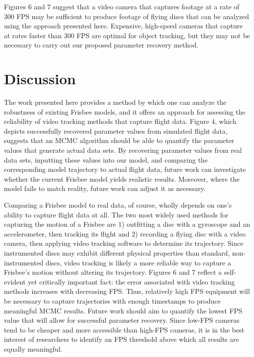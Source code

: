 \documentclass[a4paper,12pt, oneside]{article}
\begin{document}
Figures 6 and 7 suggest that a video camera that captures footage at a rate of 300 FPS may be sufficient to produce footage of flying discs that can be analyzed using the approach presented here. Expensive, high-speed cameras that capture at rates faster than 300 FPS are optimal for object tracking, but they may not be necessary to carry out our proposed parameter recovery method.

\section{Discussion}
The work presented here provides a method by which one can analyze the robustness of existing Frisbee models, and it offers an approach for assessing the reliability of video tracking methods that capture flight data.  Figure 4, which depicts successfully recovered parameter values from simulated flight data, suggests that an MCMC algorithm should be able to quantify the parameter values that generate actual data sets. By recovering parameter values from real data sets, inputting these values into our model, and comparing the corresponding model trajectory to actual flight data, future work can investigate whether the current Frisbee model yields realistic results. Moreover, where the model fails to match reality, future work can adjust it as necessary. 

Comparing a Frisbee model to real data, of course, wholly depends on one's ability to capture flight data at all. The two most widely used methods for capturing the motion of a Frisbee are 1) outfitting a disc with a gyroscope and an accelerometer, then tracking its flight and 2) recording a flying disc with a video camera, then applying video tracking software to determine its trajectory. Since instrumented discs may exhibit different physical properties than standard, non-instrumented discs, video tracking is likely a more reliable way to capture a Frisbee's motion without altering its trajectory. Figures 6 and 7 reflect a self-evident yet critically important fact: the error associated with video tracking methods increases with decreasing FPS. Thus, relatively high FPS equipment will be necessary to capture trajectories with enough timestamps to produce meaningful MCMC results. Future work should aim to quantify the lowest FPS value that will allow for successful parameter recovery. Since low-FPS cameras tend to be cheaper and more accessible than high-FPS cameras, it is in the best interest of researchers to identify an FPS threshold above which all results are equally meaningful. 
\end{document}
